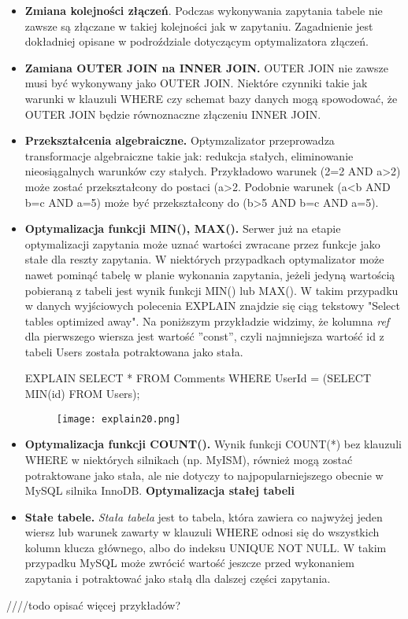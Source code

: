 \begin{itemize}
	\item \textbf{Zmiana kolejności złączeń}. Podczas wykonywania zapytania tabele nie zawsze są złączane w takiej kolejności jak w zapytaniu. Zagadnienie jest dokładniej opisane w podroździale dotyczącym optymalizatora złączeń.
	\item \textbf{Zamiana OUTER JOIN na INNER JOIN.} OUTER JOIN nie zawsze musi być wykonywany jako OUTER JOIN. Niektóre czynniki takie jak warunki w klauzuli WHERE czy schemat bazy danych mogą spowodować, że OUTER JOIN będzie równoznaczne złączeniu INNER JOIN. 
	\item \textbf{Przekształcenia algebraiczne.} Optymzalizator przeprowadza transformacje algebraiczne takie jak: redukcja stałych, eliminowanie nieosiągalnych warunków czy stałych. Przykładowo warunek (2=2 AND a>2) może zostać przekształcony do postaci (a>2. Podobnie warunek (a<b AND b=c AND a=5) może być przekształcony do (b>5 AND b=c AND a=5).
	\item \textbf{Optymalizacja funkcji MIN(), MAX().}
	Serwer już na etapie optymalizacji zapytania może uznać wartości zwracane przez funkcje jako stałe dla reszty zapytania. W niektórych przypadkach optymalizator może nawet pominąć tabelę w planie wykonania zapytania, jeżeli jedyną wartością pobieraną z tabeli jest wynik funkcji MIN() lub MAX(). W takim przypadku w danych wyjściowych polecenia EXPLAIN znajdzie się ciąg tekstowy "Select tables optimized away".
	Na poniższym przykładzie widzimy, że kolumna \textit{ref} dla pierwszego wiersza jest wartość ''const'', czyli najmniejsza wartość id z tabeli Users została potraktowana jako stała.
	\begin{spverbatim}
		EXPLAIN SELECT * FROM Comments WHERE UserId = (SELECT MIN(id) FROM Users);
	\end{spverbatim}
	\begin{figure}[H]
		\texttt{[image: explain20.png]} 
	\end{figure}
	\item \textbf{Optymalizacja funkcji COUNT().} Wynik funkcji COUNT(*) bez klauzuli WHERE w niektórych silnikach (np. MyISM), również mogą zostać potraktowane jako stała, ale nie dotyczy to najpopularniejszego obecnie w MySQL silnika InnoDB.
	\textbf{Optymalizacja stałej tabeli}
	
	\item \textbf{Stałe tabele.} \textit{Stała tabela} jest to tabela, która zawiera co najwyżej jeden wiersz lub warunek zawarty w klauzuli WHERE odnosi się do wszystkich kolumn klucza głównego, albo do indeksu UNIQUE NOT NULL. W takim przypadku MySQL może zwrócić wartość jeszcze przed wykonaniem zapytania i potraktować jako stałą dla dalszej części zapytania.
\end{itemize}
////todo opisać więcej przykładów?

